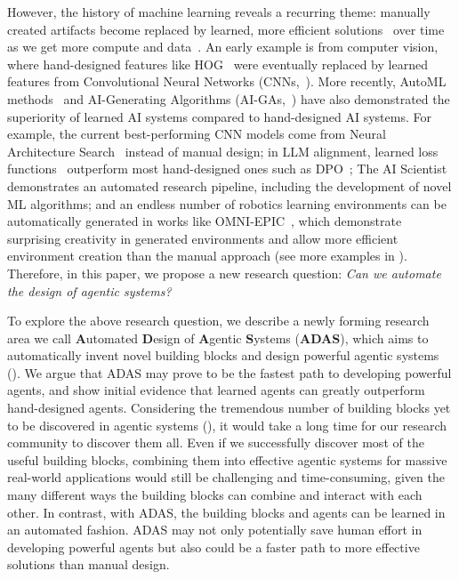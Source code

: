 \documentclass{article} %
\newcommand{\problem}{ADAS\xspace}
\begin{document}
However, the history of machine learning reveals a recurring theme: manually created artifacts become replaced by learned, more efficient solutions~\citep{clune2019aigas} over time as we get more compute and data~\citep{sutton2019bitter}.
An early example is from computer vision, where hand-designed features like HOG~\citep{Dalal2005hog} were eventually replaced by learned features from Convolutional Neural Networks (CNNs,~\citet{krizhevsky2012alexnet}).
More recently, AutoML methods~\citep{hutter2019automl} and AI-Generating Algorithms (AI-GAs,~\citet{clune2019aigas}) have also demonstrated the superiority of learned AI systems compared to hand-designed AI systems.
For example, the current best-performing CNN models come from Neural Architecture Search~\citep{elsken2019neural,shen2023deepmad} instead of manual design; in LLM alignment, learned loss functions~\citep{lu2024discopop} outperform most hand-designed ones such as DPO~\citep{rafailov2024dpo}; The AI Scientist~\citep{lu2024aiscientist} demonstrates an automated research pipeline, including the development of novel ML algorithms; and an endless number of robotics learning environments can be automatically generated in works like OMNI-EPIC~\citep{faldor2024omni}, which demonstrate surprising creativity in generated environments and allow more efficient environment creation than the manual approach (see more examples in ).
Therefore, in this paper, we propose a new research question: \emph{Can we automate the design of agentic systems?}

To explore the above research question, we describe a newly forming research area we call \textbf{A}utomated \textbf{D}esign of \textbf{A}gentic \textbf{S}ystems (\textbf{\problem}), which aims to automatically invent novel building blocks and design powerful agentic systems ().
We argue that \problem may prove to be the fastest path to developing powerful agents, and show initial evidence that learned agents can greatly outperform hand-designed agents.
Considering the tremendous number of building blocks yet to be discovered in agentic systems (), it would take a long time for our research community to discover them all.
Even if we successfully discover most of the useful building blocks, combining them into effective agentic systems for massive real-world applications would still be challenging and time-consuming, given the many different ways the building blocks can combine and interact with each other.
In contrast, with \problem, the building blocks and agents can be learned in an automated fashion.
\problem may not only potentially save human effort in developing powerful agents but also could be a faster path to more effective solutions than manual design.
\end{document}

